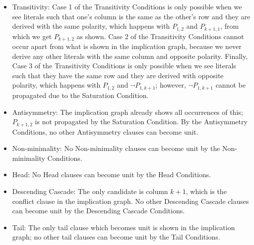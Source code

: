 \documentclass[a4paper,UKenglish,cleveref, autoref, thm-restate]{lipics-v2021}
\begin{document}
\begin{itemize}
    \item Transitivity:  Case 1 of the Transitivity Conditions is only possible when we see literals such that one's column is the same as the other's row and they are derived with the same polarity, which happens with $P_{1, 2}$ and $P_{k + 1, 1}$, from which we get $P_{k + 1, 2}$ as shown. Case 2 of the Transitivity Conditions cannot occur apart from what is shown in the implication graph, because we never derive any other literals with the same column and opposite polarity. Finally, Case 3 of the Transitivity Conditions is only possible when we see literals such that they have the same row and they are derived with opposite polarity, which happens with $P_{1, 2}$ and $\neg P_{1, k + 1}$; however, $\neg P_{1, k + 1}$ cannot be propagated due to the Saturation Condition.
    \item Antisymmetry: The implication graph already shows all occurrences of this; $P_{k + 1, 2}$ is not propagated by the Saturation Condition. By the Antisymmetry Conditions, no other Antisymmetry clauses can become unit. 
    \item Non-minimality: No Non-minimality clauses can become unit by the Non-minimality Conditions. 
    \item Head: No Head clauses can become unit by the Head Conditions. 
    \item Descending Cascade: The only candidate is column $k + 1$, which is the conflict clause in the implication graph. No other Descending Cascade clauses can become unit by the Descending Cascade Conditions. 
    \item Tail: The only tail clause which becomes unit is shown in the implication graph; no other tail clauses can become unit by the Tail Conditions. 
\end{itemize}
\end{document}

